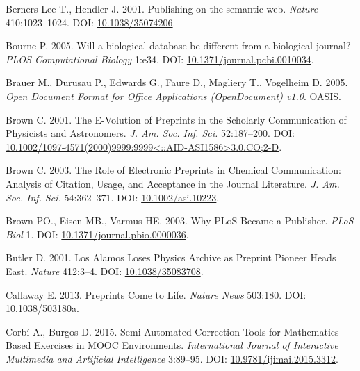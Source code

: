 \documentclass[10pt,fleqn]{wlpeerj}
\begin{document}
\hypertarget{ref-berners-leeux5fpublishingux5f2001}{}
Berners-Lee T., Hendler J. 2001. Publishing on the semantic web.
\emph{Nature} 410:1023--1024. DOI:
\href{https://doi.org/10.1038/35074206}{10.1038/35074206}.

\hypertarget{ref-bourneux5fdatabaseux5f2005}{}
Bourne P. 2005. Will a biological database be different from a
biological journal? \emph{PLOS Computational Biology} 1:e34. DOI:
\href{https://doi.org/10.1371/journal.pcbi.0010034}{10.1371/journal.pcbi.0010034}.

\hypertarget{ref-ODF}{}
Brauer M., Durusau P., Edwards G., Faure D., Magliery T., Vogelheim D.
2005. \emph{Open Document Format for Office Applications (OpenDocument)
v1.0}. OASIS.

\hypertarget{ref-brownux5fe-volutionux5f2001}{}
Brown C. 2001. The E-Volution of Preprints in the Scholarly
Communication of Physicists and Astronomers. \emph{J. Am. Soc. Inf.
Sci.} 52:187--200. DOI:
\href{https://doi.org/10.1002/1097-4571(2000)9999:9999\%3C::AID-ASI1586\%3E3.0.CO;2-D}{10.1002/1097-4571(2000)9999:9999\textless{}::AID-ASI1586\textgreater{}3.0.CO;2-D}.

\hypertarget{ref-brownux5froleux5f2003}{}
Brown C. 2003. The Role of Electronic Preprints in Chemical
Communication: Analysis of Citation, Usage, and Acceptance in the
Journal Literature. \emph{J. Am. Soc. Inf. Sci.} 54:362--371. DOI:
\href{https://doi.org/10.1002/asi.10223}{10.1002/asi.10223}.

\hypertarget{ref-brownux5fwhyux5f2003}{}
Brown PO., Eisen MB., Varmus HE. 2003. Why PLoS Became a Publisher.
\emph{PLoS Biol} 1. DOI:
\href{https://doi.org/10.1371/journal.pbio.0000036}{10.1371/journal.pbio.0000036}.

\hypertarget{ref-butlerux5falamosux5f2001}{}
Butler D. 2001. Los Alamos Loses Physics Archive as Preprint Pioneer
Heads East. \emph{Nature} 412:3--4. DOI:
\href{https://doi.org/10.1038/35083708}{10.1038/35083708}.

\hypertarget{ref-callawayux5fpreprintsux5f2013}{}
Callaway E. 2013. Preprints Come to Life. \emph{Nature News} 503:180.
DOI: \href{https://doi.org/10.1038/503180a}{10.1038/503180a}.

\hypertarget{ref-garnetux5fsemiautomaticux5f2015}{}
Corbí A., Burgos D. 2015. Semi-Automated Correction Tools for
Mathematics-Based Exercises in MOOC Environments. \emph{International
Journal of Interactive Multimedia and Artificial Intelligence} 3:89--95.
DOI:
\href{https://doi.org/10.9781/ijimai.2015.3312}{10.9781/ijimai.2015.3312}.
\end{document}
